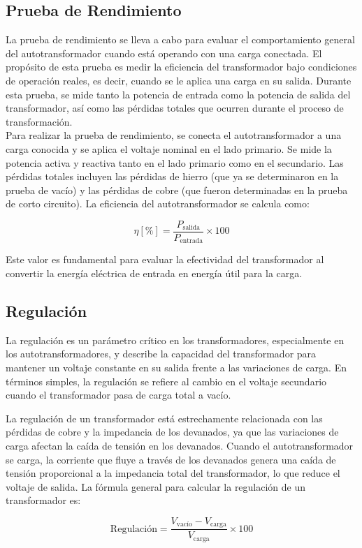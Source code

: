 \subsection*{Prueba de Rendimiento}
La prueba de rendimiento se lleva a cabo para evaluar el comportamiento general del autotransformador cuando está operando con una carga conectada. El propósito de esta prueba es medir la eficiencia del transformador bajo condiciones de operación reales, es decir, cuando se le aplica una carga en su salida. Durante esta prueba, se mide tanto la potencia de entrada como la potencia de salida del transformador, así como las pérdidas totales que ocurren durante el proceso de transformación.
\\
Para realizar la prueba de rendimiento, se conecta el autotransformador a una carga conocida y se aplica el voltaje nominal en el lado primario. Se mide la potencia activa y reactiva tanto en el lado primario como en el secundario. Las pérdidas totales incluyen las pérdidas de hierro (que ya se determinaron en la prueba de vacío) y las pérdidas de cobre (que fueron determinadas en la prueba de corto circuito). La eficiencia del autotransformador se calcula como:


\begin{equation}
\eta [\%] = \frac{P_{\text{salida}}}{P_{\text{entrada}}} \times 100
\end{equation}

Este valor es fundamental para evaluar la efectividad del transformador al convertir la energía eléctrica de entrada en energía útil para la carga.

\subsection*{Regulación}

La regulación es un parámetro crítico en los transformadores, especialmente en los autotransformadores, y describe la capacidad del transformador para mantener un voltaje constante en su salida frente a las variaciones de carga. En términos simples, la regulación se refiere al cambio en el voltaje secundario cuando el transformador pasa de carga total a vacío.

La regulación de un transformador está estrechamente relacionada con las pérdidas de cobre y la impedancia de los devanados, ya que las variaciones de carga afectan la caída de tensión en los devanados. Cuando el autotransformador se carga, la corriente que fluye a través de los devanados genera una caída de tensión proporcional a la impedancia total del transformador, lo que reduce el voltaje de salida. La fórmula general para calcular la regulación de un transformador es:

\begin{equation}
\text{Regulación} = \frac{V_{\text{vacío}} - V_{\text{carga}}}{V_{\text{carga}}} \times 100
\end{equation}
